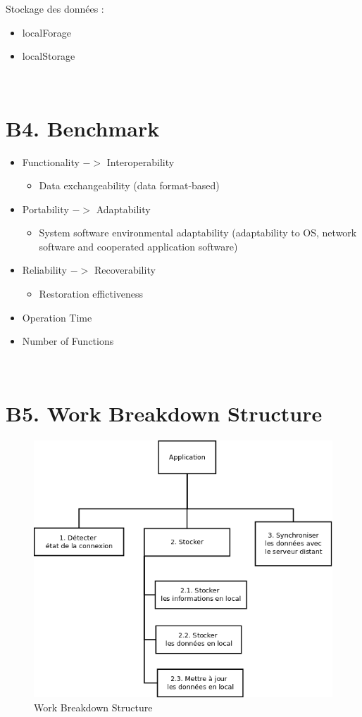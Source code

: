 	Stockage des données :
	\begin{itemize}
		\item localForage
		\item localStorage
	\end{itemize}
	~\\

\section{B4. Benchmark}

	\begin{itemize}
		\item Functionality $->$ Interoperability
			\begin{itemize}
				\item Data exchangeability (data format-based)
			\end{itemize}
		\item Portability $->$ Adaptability
			\begin{itemize}
				\item System software environmental adaptability (adaptability to OS, network software and cooperated application software)
			\end{itemize}
		\item Reliability $->$ Recoverability
			\begin{itemize}
				\item Restoration effictiveness
			\end{itemize}
		\item Operation Time
		\item Number of Functions
	\end{itemize}
	~\\

\section{B5. Work Breakdown Structure}

	\begin{figure}[h!]
		\centering
		\includegraphics[width=18cm]{./images/wbs.png}
		\caption{Work Breakdown Structure}
	\end{figure}
